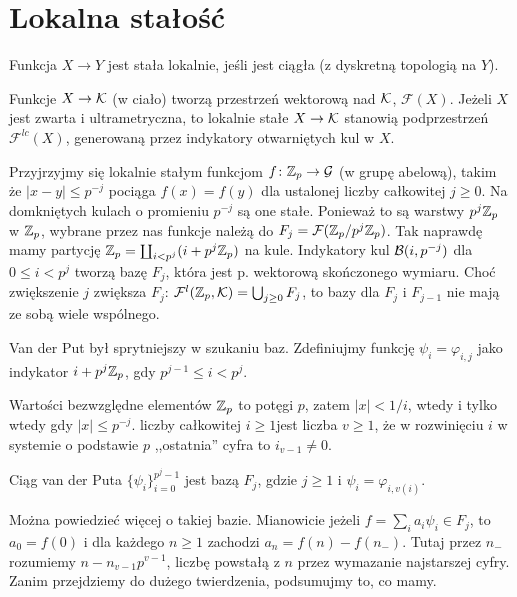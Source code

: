 \section{Lokalna stałość} %
\begin{definicja}
	Funkcja $X \to Y$ jest stała lokalnie, jeśli jest ciągła (z dyskretną topologią na $Y$).
\end{definicja}

Funkcje $X \to \mathcal K$ (w ciało) tworzą przestrzeń wektorową nad $\mathcal K$, $\mathcal F(X)$.
Jeżeli $X$ jest zwarta i ultrametryczna, to lokalnie stałe $X \to \mathcal K$ stanowią podprzestrzeń $\mathcal F^{lc}(X)$, generowaną przez indykatory otwarniętych kul w $X$.

Przyjrzyjmy się lokalnie stałym funkcjom $f \colon \mathbb Z_p \to \mathcal G$ (w grupę abelową), takim że $|x-y| \le p^{-j}$ pociąga $f(x) = f(y)$ dla ustalonej liczby całkowitej $j \ge 0$.
Na domkniętych kulach o promieniu $p^{-j}$ są one stałe.
Ponieważ to są warstwy $p^j\mathbb Z_p$ w $\mathbb Z_p$, wybrane przez nas funkcje należą do $F_j = \mathcal F(\mathbb Z_p/p^j\mathbb Z_p)$.
Tak naprawdę mamy partycję $\mathbb Z_p = \coprod_{i < p^j} (i+ p^j\mathbb Z_p)$ na kule.
Indykatory kul $\mathcal B(i, p^{-j})$ dla $0 \le i < p^j$ tworzą bazę $F_j$, która jest p. wektorową skończonego wymiaru.
Choć zwiększenie $j$ zwiększa $F_j$: $\mathcal F^l(\mathbb Z_p, \mathcal K) = \bigcup_{j \ge 0} F_j$, to bazy dla $F_j$ i $F_{j-1}$ nie mają ze sobą wiele wspólnego.

Van der Put był sprytniejszy w szukaniu baz.
Zdefiniujmy funkcję $\psi_i = \varphi_{i,j}$ jako indykator $i + p^j\mathbb Z_p$, gdy $p^{j-1} \le i < p^j$.

Wartości bezwzględne elementów $\mathbb Z_p$ to potęgi $p$, zatem $|x| < 1/i$, wtedy i tylko wtedy gdy $|x| \le p^{-j}$.
 liczby całkowitej $i \ge 1$jest liczba $v \ge 1$, że w rozwinięciu $i$ w systemie o podstawie $p$ ,,ostatnia'' cyfra to $i_{v-1} \neq 0$. 

\begin{fakt}[i definicja]
	Ciąg van der Puta $\{\psi_i\}_{i=0}^{p^j-1}$ jest bazą $F_j$, gdzie $j \ge 1$ i $\psi_i = \varphi_{i, v(i)}$.
\end{fakt}

Można powiedzieć więcej o takiej bazie. Mianowicie jeżeli $f = \sum_i a_i \psi_i \in F_j$, to $a_0 = f(0)$ i dla każdego $n \ge 1$ zachodzi $a_n = f(n) - f(n_-)$.
Tutaj przez $n_-$ rozumiemy $n - n_{v-1}p^{v-1}$, liczbę powstałą z $n$ przez wymazanie najstarszej cyfry.
Zanim przejdziemy do dużego twierdzenia, podsumujmy to, co mamy.

